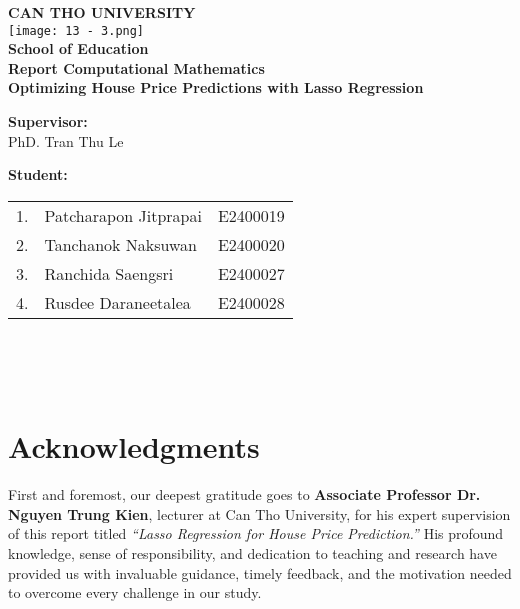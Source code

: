 \documentclass[12pt, a4paper]{report}
\begin{document}
\begin{titlepage}
    \begin{center}
        \textbf{\LARGE CAN THO UNIVERSITY}\\
        \vspace{2cm}
        \texttt{[image: 13 - 3.png]} \\
        \vspace{1cm}
        \textbf{\Large School of Education}\\
        \vspace{0.5cm}
        {\Large \textbf{Report Computational Mathematics}}
        \vspace{2cm}\\
        {\Huge \textbf{Optimizing House Price Predictions with Lasso Regression}}
    \end{center}
\vspace{1cm}
\noindent
\begin{minipage}[l]{0.45\linewidth}
    \textbf{Supervisor:} \\
     PhD. Tran Thu Le
\end{minipage}
\hfill
\begin{minipage}[l]{0.45\linewidth}
    \textbf{Student:} \\
     \begin{tabular}{lll}
    1. & Patcharapon Jitprapai\phantom{h} & E2400019 \\
    2. & Tanchanok Naksuwan & E2400020 \\
    3. & Ranchida Saengsri & E2400027 \\
    4. & Rusdee Daraneetalea & E2400028 \\

\end{tabular}\\
\end{minipage}\\          
\end{titlepage}

\chapter*{Acknowledgments}

\noindent
\par First and foremost, our deepest gratitude goes to \textbf{Associate Professor Dr. Nguyen Trung Kien}, lecturer at Can Tho University, for his expert supervision of this report titled \textit{“Lasso Regression for House Price Prediction.”} His profound knowledge, sense of responsibility, and dedication to teaching and research have provided us with invaluable guidance, timely feedback, and the motivation needed to overcome every challenge in our study.
\end{document}
